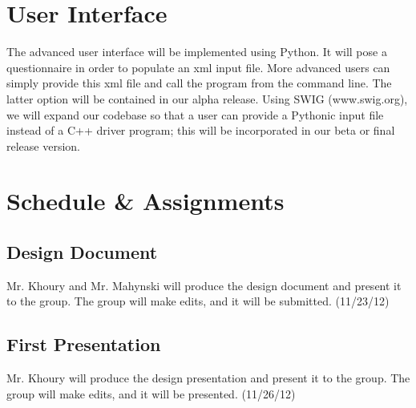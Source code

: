 \documentclass[10pt]{article}
\begin{document}
\section{User Interface}
The advanced user interface will be implemented using Python. It will pose a questionnaire in order to populate an xml input file.  More advanced users can simply provide this xml file and call the program from the command line.  The latter option will be contained in our alpha release.  Using SWIG (www.swig.org), we will expand our codebase so that a user can provide a Pythonic input file instead of a C++ driver program; this will be incorporated in our beta or final release version.


\section{Schedule \& Assignments}
\subsection{Design Document}
Mr. Khoury and Mr. Mahynski will produce the design document and present it to the group. The group will make edits, and it will be submitted. (11/23/12)

\subsection{First Presentation}
Mr. Khoury will produce the design presentation and present it to the group. The group will make edits, and it will be presented. (11/26/12)
\end{document}
